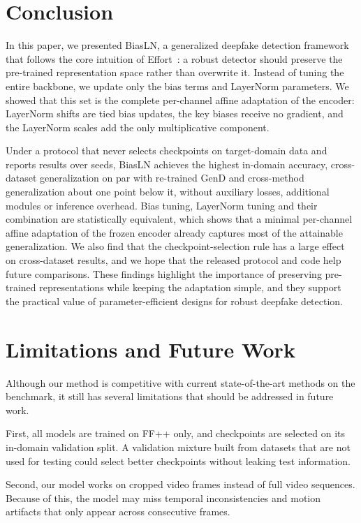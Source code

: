 \documentclass[fonts]{icst}
\newif\ifrevmark\revmarktrue
\newcommand{\rev}[1]{\ifrevmark{\color{revblue}#1}\else#1\fi}
\begin{document}
\section{Conclusion}

In this paper, we presented BiasLN, a generalized deepfake detection framework that follows the core intuition of Effort~\cite{yan2025effort}: a robust detector should preserve the pre-trained representation space \rev{rather than overwrite it}.
Instead of tuning the entire backbone, we update only the bias terms and LayerNorm parameters. \rev{We showed that this set is the complete per-channel affine adaptation of the encoder: LayerNorm shifts are tied bias updates, the key biases receive no gradient, and the LayerNorm scales add the only multiplicative component.}

\rev{Under a protocol that never selects checkpoints on target-domain data and reports results over seeds, BiasLN achieves the highest in-domain accuracy, cross-dataset generalization on par with re-trained GenD and cross-method generalization about one point below it, without auxiliary losses, additional modules or inference overhead. Bias tuning, LayerNorm tuning and their combination are statistically equivalent, which shows that a minimal per-channel affine adaptation of the frozen encoder already captures most of the attainable generalization.}
\rev{We also find that the checkpoint-selection rule has a large effect on cross-dataset results, and we hope that the released protocol and code help future comparisons.}
These findings highlight the importance of preserving pre-trained representations while keeping the adaptation simple, and they support the practical value of parameter-efficient designs for robust deepfake detection.

\section{Limitations and Future Work}
\label{sec:limits}
Although our method \rev{is competitive with} current state-of-the-art methods on the benchmark, it still has several limitations that should be addressed in future work.

\rev{First, all models are trained on FF++ only, and checkpoints are selected on its in-domain validation split. A validation mixture built from datasets that are not used for testing could select better checkpoints without leaking test information.}

Second, our model works on cropped video frames instead of full video sequences.
Because of this, the model may miss temporal inconsistencies and motion artifacts that only appear across consecutive frames.
\end{document}
